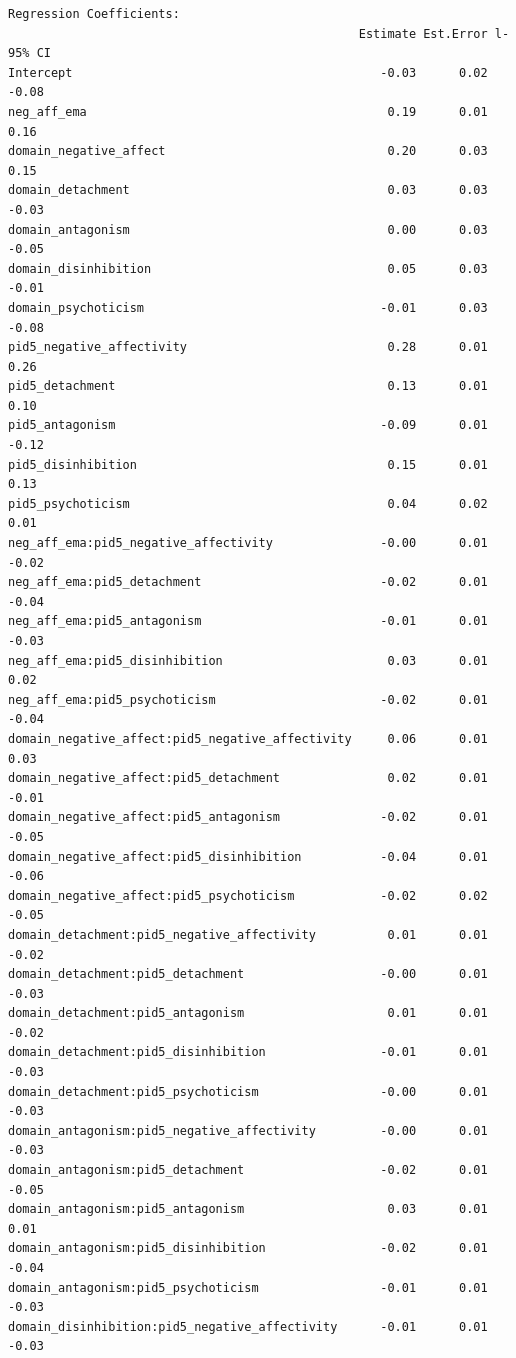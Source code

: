\documentclass[
  11pt,
  a4paper,
  onecolumn]{article}
\begin{document}
\begin{verbatim}
Regression Coefficients:
                                                 Estimate Est.Error l-95% CI
Intercept                                           -0.03      0.02    -0.08
neg_aff_ema                                          0.19      0.01     0.16
domain_negative_affect                               0.20      0.03     0.15
domain_detachment                                    0.03      0.03    -0.03
domain_antagonism                                    0.00      0.03    -0.05
domain_disinhibition                                 0.05      0.03    -0.01
domain_psychoticism                                 -0.01      0.03    -0.08
pid5_negative_affectivity                            0.28      0.01     0.26
pid5_detachment                                      0.13      0.01     0.10
pid5_antagonism                                     -0.09      0.01    -0.12
pid5_disinhibition                                   0.15      0.01     0.13
pid5_psychoticism                                    0.04      0.02     0.01
neg_aff_ema:pid5_negative_affectivity               -0.00      0.01    -0.02
neg_aff_ema:pid5_detachment                         -0.02      0.01    -0.04
neg_aff_ema:pid5_antagonism                         -0.01      0.01    -0.03
neg_aff_ema:pid5_disinhibition                       0.03      0.01     0.02
neg_aff_ema:pid5_psychoticism                       -0.02      0.01    -0.04
domain_negative_affect:pid5_negative_affectivity     0.06      0.01     0.03
domain_negative_affect:pid5_detachment               0.02      0.01    -0.01
domain_negative_affect:pid5_antagonism              -0.02      0.01    -0.05
domain_negative_affect:pid5_disinhibition           -0.04      0.01    -0.06
domain_negative_affect:pid5_psychoticism            -0.02      0.02    -0.05
domain_detachment:pid5_negative_affectivity          0.01      0.01    -0.02
domain_detachment:pid5_detachment                   -0.00      0.01    -0.03
domain_detachment:pid5_antagonism                    0.01      0.01    -0.02
domain_detachment:pid5_disinhibition                -0.01      0.01    -0.03
domain_detachment:pid5_psychoticism                 -0.00      0.01    -0.03
domain_antagonism:pid5_negative_affectivity         -0.00      0.01    -0.03
domain_antagonism:pid5_detachment                   -0.02      0.01    -0.05
domain_antagonism:pid5_antagonism                    0.03      0.01     0.01
domain_antagonism:pid5_disinhibition                -0.02      0.01    -0.04
domain_antagonism:pid5_psychoticism                 -0.01      0.01    -0.03
domain_disinhibition:pid5_negative_affectivity      -0.01      0.01    -0.03

\end{verbatim}
\end{document}
